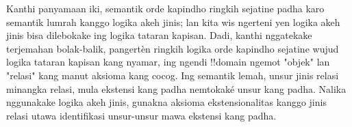 \documentclass[../../../include/open-logic-section]{subfiles}
\begin{document}
Kanthi panyamaan iki,
semantik orde kapindho
ringkih sejatine padha
karo semantik lumrah
kanggo logika akeh jinis;
lan kita wis ngerteni
yen logika akeh jinis
bisa dilebokake ing
logika tataran kapisan. Dadi,
kanthi nggatekake
terjemahan bolak-balik,
pangertèn ringkih
logika orde kapindho
sejatine wujud logika tataran
kapisan kang nyamar,
ing ngendi !!{domain}
ngemot "objek" lan
"relasi" kang manut
aksioma kang cocog. Ing semantik lemah, unsur jinis relasi minangka relasi, mula ekstensi kang padha nemtokaké unsur kang padha. Nalika nggunakake logika akeh jinis, gunakna aksioma ekstensionalitas kanggo jinis relasi utawa identifikasi unsur-unsur mawa ekstensi kang padha.
\end{document}
